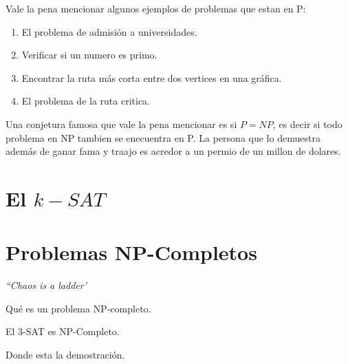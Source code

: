 Vale la pena mencionar algunos ejemplos de problemas que estan en P:
\begin{enumerate}
\item El problema de admisión a universidades.
\item Verificar si un numero es primo.
\item Encontrar la ruta más corta entre dos vertices en una gráfica.
\item El problema de la ruta critica. 
\end{enumerate}

Una conjetura famosa que vale la pena mencionar es si $P=NP$, es decir si todo problema en NP tambien se enecuentra en P. La persona que lo demuestra además de ganar fama y traajo es acredor a un permio de un millon de dolares. 

\section{El $k-SAT$}
\section{Problemas NP-Completos}
\begin{flushright}
\textit{``Chaos is a ladder'}
\end{flushright}
\begin{dfn}
Qué es un problema NP-completo. 
\end{dfn}
\begin{teo}
El 3-SAT es NP-Completo.
\end{teo}
Donde esta la demostración. 